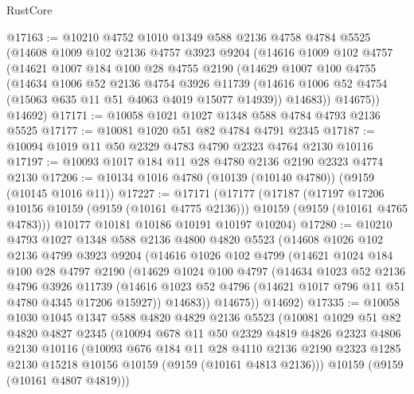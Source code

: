\begin{lexlean}{RustCore}
\begin{coremodule}
@17163 := @10210
    @4752
    @1010
    @1349
    @588
    @2136
    @4758
    @4784
    @5525
    (@14608
      @1009
      @102
      @2136
      @4757
      @3923
      @9204
      (@14616
        @1009
        @102
        @4757
        (@14621
          @1007
          @184
          @100
          @28
          @4755
          @2190
          (@14629
            @1007
            @100
            @4755
            (@14634
              @1006
              @52
              @2136
              @4754
              @3926
              @11739
              (@14616 @1006 @52 @4754 (@15063 @635 @11 @51 @4063 @4019 @15077 @14939))
              @14683))
          @14675))
      @14692)
@17171 := @10058 @1021 @1027 @1348 @588 @4784 @4793 @2136 @5525
@17177 := @10081 @1020 @51 @82 @4784 @4791 @2345
@17187 := @10094 @1019 @11 @50 @2329 @4783 @4790 @2323 @4764 @2130 @10116
@17197 := @10093 @1017 @184 @11 @28 @4780 @2136 @2190 @2323 @4774 @2130
@17206 := @10134 @1016 @4780 (@10139 (@10140 @4780)) (@9159 (@10145 @1016 @11))
@17227 := @17171
    (@17177
      (@17187
        (@17197 @17206 @10156 @10159 (@9159 (@10161 @4775 @2136)))
        @10159
        (@9159 (@10161 @4765 @4783)))
      @10177
      @10181
      @10186
      @10191
      @10197
      @10204)
@17280 := @10210
    @4793
    @1027
    @1348
    @588
    @2136
    @4800
    @4820
    @5523
    (@14608
      @1026
      @102
      @2136
      @4799
      @3923
      @9204
      (@14616
        @1026
        @102
        @4799
        (@14621
          @1024
          @184
          @100
          @28
          @4797
          @2190
          (@14629
            @1024
            @100
            @4797
            (@14634
              @1023
              @52
              @2136
              @4796
              @3926
              @11739
              (@14616 @1023 @52 @4796 (@14621 @1017 @796 @11 @51 @4780 @4345 @17206 @15927))
              @14683))
          @14675))
      @14692)
@17335 := @10058
    @1030
    @1045
    @1347
    @588
    @4820
    @4829
    @2136
    @5523
    (@10081
      @1029
      @51
      @82
      @4820
      @4827
      @2345
      (@10094
        @678
        @11
        @50
        @2329
        @4819
        @4826
        @2323
        @4806
        @2130
        @10116
        (@10093
          @676
          @184
          @11
          @28
          @4110
          @2136
          @2190
          @2323
          @1285
          @2130
          @15218
          @10156
          @10159
          (@9159 (@10161 @4813 @2136)))
        @10159
        (@9159 (@10161 @4807 @4819)))

\end{coremodule}
\end{lexlean}
